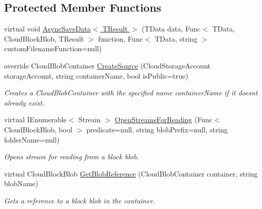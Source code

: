 \subsection*{Protected Member Functions}
\begin{DoxyCompactItemize}
\item 
virtual void \hyperlink{classCqrs_1_1Azure_1_1BlobStorage_1_1BlobStorageStore_a70157155d5b9ea9d1ac752014d6d0df6_a70157155d5b9ea9d1ac752014d6d0df6}{Async\+Save\+Data$<$ T\+Result $>$} (T\+Data data, Func$<$ T\+Data, Cloud\+Block\+Blob, T\+Result $>$ function, Func$<$ T\+Data, string $>$ custom\+Filename\+Function=null)
\item 
override Cloud\+Blob\+Container \hyperlink{classCqrs_1_1Azure_1_1BlobStorage_1_1BlobStorageStore_a68828f9e6c1f0d297623e5f0c9af0e7e_a68828f9e6c1f0d297623e5f0c9af0e7e}{Create\+Source} (Cloud\+Storage\+Account storage\+Account, string container\+Name, bool is\+Public=true)
\begin{DoxyCompactList}\small\item\em Creates a Cloud\+Blob\+Container with the specified name {\itshape container\+Name}  if it doesn\textquotesingle{}t already exist. \end{DoxyCompactList}\item 
virtual I\+Enumerable$<$ Stream $>$ \hyperlink{classCqrs_1_1Azure_1_1BlobStorage_1_1BlobStorageStore_a6a916e23890ba65048e449353bbd17c2_a6a916e23890ba65048e449353bbd17c2}{Open\+Streams\+For\+Reading} (Func$<$ Cloud\+Block\+Blob, bool $>$ predicate=null, string blob\+Prefix=null, string folder\+Name=null)
\begin{DoxyCompactList}\small\item\em Opens stream for reading from a block blob. \end{DoxyCompactList}\item 
virtual Cloud\+Block\+Blob \hyperlink{classCqrs_1_1Azure_1_1BlobStorage_1_1BlobStorageStore_a2d38c9a30365ae357f3cf5e300c6ca25_a2d38c9a30365ae357f3cf5e300c6ca25}{Get\+Blob\+Reference} (Cloud\+Blob\+Container container, string blob\+Name)
\begin{DoxyCompactList}\small\item\em Gets a reference to a block blob in the container. \end{DoxyCompactList}\end{DoxyCompactItemize}
